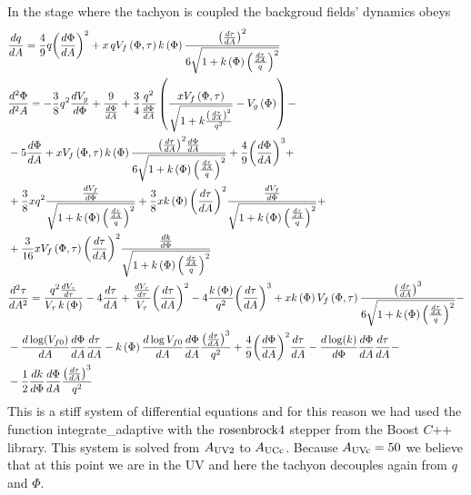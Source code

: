 \documentclass[a4paper,12pt]{article}
\begin{document}
In the stage where the tachyon is coupled the backgroud fields' dynamics obeys
\begin{align}
& \frac{dq}{dA} = \frac{4}{9} q {\left(\frac{d\Phi}{dA}\right)}^2 + x \, q V_f \left(\Phi, \tau\right) k\left(\Phi\right) \frac{{\left(\frac{d\tau}{dA}\right)}^2}{6\sqrt{1+ k\left(\Phi\right) {\left(\frac{\frac{d\tau}{dA}}{q}\right)}^2}} \\
& \frac{d^2 \Phi}{d^2A} = - \frac{3}{8} q^2 \frac{d V_g}{d\Phi} + \frac{9}{\frac{d\Phi}{dA}} + \frac{3}{4} \frac{q^2}{\frac{d\Phi}{dA}} \left( \frac{x V_f \left(\Phi, \tau\right)}{\sqrt{1+ k \frac{{\left(\frac{d\tau}{dA}\right)}^2}{q^2}}} - V_g \left(\Phi\right) \right) - \\ \notag
& - 5 \frac{d\Phi}{d A} + x V_f \left(\Phi, \tau\right) k \left(\Phi\right) \frac{{\left(\frac{d\tau}{dA}\right)}^2 \frac{d\Phi}{dA}}{6 \sqrt{1+ k\left(\Phi\right) {\left(\frac{\frac{d\tau}{dA}}{q}\right)}^2 }} + \frac{4}{9} {\left(\frac{d\Phi}{dA}\right)}^3 + \\ \notag
& + \frac{3}{8} x q^2 \frac{\frac{d V_f}{d\Phi}}{\sqrt{1+ k\left(\Phi\right) {\left(\frac{\frac{d\tau}{dA}}{q}\right)}^2}} + \frac{3}{8} x k\left(\Phi\right) {\left( \frac{d\tau}{dA}\right)}^2 \frac{\frac{dV_f}{d\Phi}}{\sqrt{1+ k\left(\Phi\right) {\left(\frac{\frac{d\tau}{dA}}{q}\right)}^2}} + \\ \notag
& + \frac{3}{16} x V_f\left(\Phi, \tau\right) {\left( \frac{d\tau}{dA}\right)}^2 \frac{\frac{dk}{d \Phi}}{\sqrt{1+ k\left(\Phi\right) {\left(\frac{\frac{d\tau}{dA}}{q}\right)}^2}} \\ \notag
& \frac{d^2 \tau}{d A^2} =  \frac{q^2 \frac{d V_\tau}{d\tau}}{V_{\tau} \, k\left(\Phi\right)} - 4 \frac{d\tau}{d A} + \frac{\frac{dV_{\tau}}{d\tau}}{V_{\tau}} {\left(\frac{d\tau}{dA}\right)}^2 - 4\frac{k\left(\Phi\right)}{q^2} {\left(\frac{d\tau}{dA}\right)}^3 + x k\left(\Phi\right) V_f \left(\Phi, \tau \right) \frac{{\left(\frac{d\tau}{dA}\right)}^3}{6 \sqrt{1+ k\left(\Phi\right) {\left(\frac{\frac{d\tau}{dA}}{q}\right)}^2}} - \\
& - \frac{d \log(V_{f0})}{dA} \frac{d\Phi}{dA} \frac{d\tau}{dA} - k \left(\Phi\right) \frac{d\log V_{f0}}{dA} \frac{d\Phi}{dA}\frac{{\left(\frac{d\tau}{d A}\right)}^3}{q^2} + \frac{4}{9} {\left(\frac{d\Phi}{dA}\right)}^2 \frac{d\tau}{dA} - \frac{d \log(k)}{d\Phi} \frac{d\Phi}{dA} \frac{d\tau}{dA} - \\ \notag
& - \frac{1}{2} \frac{d k}{d\Phi} \frac{d\Phi}{dA} \frac{{\left( \frac{d\tau}{dA}\right)}^3}{q^2}
\end{align}
This is a stiff system of differential equations and for this reason we had used the function integrate\_adaptive with the $\rm{rosenbrock4}$ stepper from the Boost $C\texttt{++}$ library. This system is solved from $A_{\rm{UV2}}$ to $A_{\rm{UCc}}$. Because $A_{\rm{UVc}} = 50$ we believe that at this point we are in the UV and here the tachyon decouples again from $q$ and $\Phi$.
\end{document}
